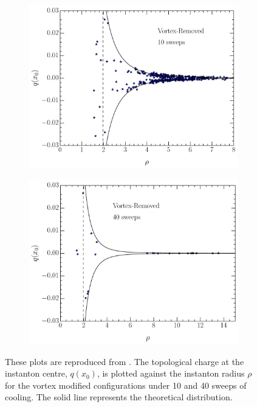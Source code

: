 \begin{figure}
\begin{subfigure}[]{0.5\textwidth}
\includegraphics[width=\columnwidth]{./VRcool10.pdf}
\end{subfigure}
\begin{subfigure}[]{0.5\textwidth}
\label{VRcool40}
\includegraphics[width=\columnwidth]{./VRcool40.pdf}
\end{subfigure}
\caption[The topological charge at the instanton centre is plotted against the instanton radius for the vortex modified configurations under 10 and 40 sweeps of cooling.]{\label{fig:InstantonRadius} These plots are reproduced from \citet{Trewartha:2015ida}. The topological charge at the instanton centre, $q(x_0)$, is plotted against the instanton radius $\rho$ for the vortex modified configurations under 10 and 40 sweeps of cooling. The solid line represents the theoretical distribution. }
\end{figure}
